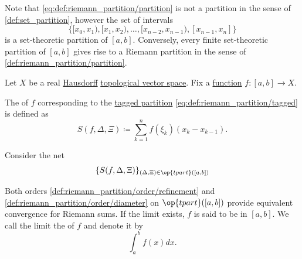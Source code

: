 \begin{remark}\label{rem:set_and_riemann_partitions}
  Note that \eqref{eq:def:riemann_partition/partition} is not a partition in the sense of \cref{def:set_partition}, however the set of intervals
  \begin{equation*}
    \Big\{ [x_0, x_1), [x_1, x_2), \ldots, [x_{n-2}, x_{n-1}), [x_{n-1}, x_n] \Big\}
  \end{equation*}
  is a set-theoretic partition of \( [a, b] \). Conversely, every finite set-theoretic partition of \( [a, b] \) gives rise to a Riemann partition in the sense of \cref{def:riemann_partition/partition}.
\end{remark}

\begin{definition}\label{def:riemann_integral}
  Let \( X \) be a real \hyperref[def:separation_axioms/T2]{Hausdorff} \hyperref[def:topological_vector_space]{topological vector space}. Fix a \hyperref[def:function]{function} \( f: [a, b] \to X \).

  The  of \( f \) corresponding to the \hyperref[def:riemann_partition/tagged]{tagged partition} \eqref{eq:def:riemann_partition/tagged} is defined as
  \begin{equation*}
    S(f, \Delta, \Xi) \coloneqq \sum_{k=1}^n f(\xi_k) (x_k - x_{k-1}).
  \end{equation*}

  Consider the net
  \begin{equation}\label{eq:def:riemann_integral/net}
    \{ S(f, \Delta, \Xi) \}_{(\Delta, \Xi) \in \op{tpart}([a, b])}
  \end{equation}

  Both orders \cref{def:riemann_partition/order/refinement} and \cref{def:riemann_partition/order/diameter} on \( \op{tpart}([a, b]) \) provide equivalent convergence for Riemann sums. If the limit exists, \( f \) is said to be  in \( [a, b] \). We call the limit the  of \( f \) and denote it by
  \begin{equation}\label{eq:def:riemann_integral}
    \int_a^b f(x) dx.
  \end{equation}
\end{definition}
